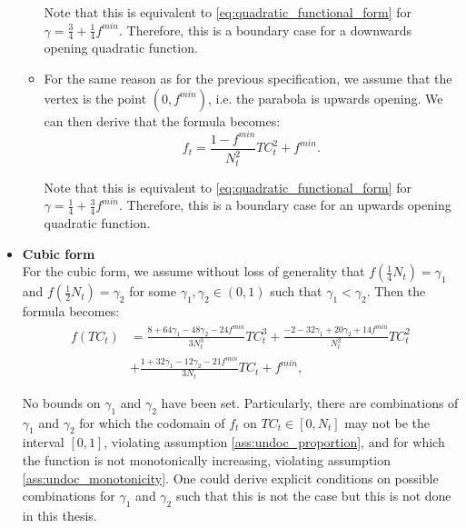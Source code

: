 \documentclass[12pt]{article}
\begin{document}
\begin{itemize}
\begin{itemize}
		        Note that this is equivalent to \eqref{eq:quadratic_functional_form} for $\gamma = \frac{3}{4} + \frac{1}{4} f^{min}$. Therefore, this is a boundary case for a downwards opening quadratic function.
		        
		        \item For the same reason as for the previous specification, we assume that the vertex is the point $(0, f^{min})$, i.e. the parabola is upwards opening. We can then derive that the formula becomes:
		            \begin{equation} \label{eq:quadratic_upwards_functional_form}
		                f_t = \frac{1-f^{min}}{N_t^2}TC_t^2 + f^{min}.
		            \end{equation}
		            
		        Note that this is equivalent to \eqref{eq:quadratic_functional_form} for $\gamma = \frac{1}{4} + \frac{3}{4}f^{min}$. Therefore, this is a boundary case for an upwards opening quadratic function.
		    \end{itemize}
		    
		\item \textbf{Cubic form}\\
		For the cubic form, we assume without loss of generality that $f\left(\frac{1}{4}N_t\right) = \gamma_1$ and $f\left(\frac{1}{2}N_t\right) = \gamma_2$ for some $\gamma_1, \gamma_2 \in (0,1)$ such that $\gamma_1 < \gamma_2$. Then the formula becomes:
		    \begin{equation} \label{eq:cubic_functional_form}
		        \begin{split}
            		f(TC_t) &= \frac{8 + 64\gamma_1 - 48\gamma_2 -24f^{min}}{3N_t^3}TC_t^3 + \frac{-2 - 32\gamma_1 + 20\gamma_2 + 14f^{min}}{N_t^2}TC_t^2 \\
            		&+ \frac{1 + 32\gamma_1 - 12\gamma_2 - 21f^{min}}{3N_t}TC_t + f^{min},
        		\end{split}
		    \end{equation}
		    
	    No bounds on $\gamma_1$ and $\gamma_2$ have been set. Particularly, there are combinations of $\gamma_1$ and $\gamma_2$ for which the codomain of $f_t$ on $TC_t \in [0,N_t]$ may not be the interval $[0,1]$, violating assumption \ref{ass:undoc_proportion}, and for which the function is not monotonically increasing, violating assumption \ref{ass:undoc_monotonicity}. One could derive explicit conditions on possible combinations for $\gamma_1$ and $\gamma_2$ such that this is not the case but this is not done in this thesis.
	\end{itemize}
	
\end{document}
